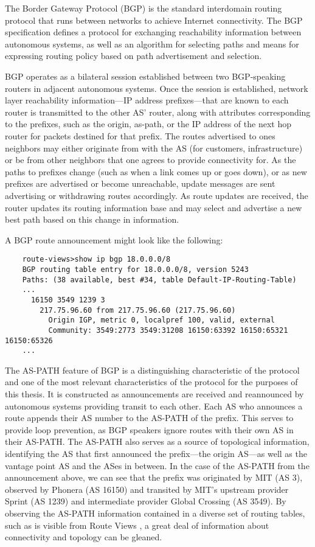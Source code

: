 The Border Gateway Protocol (BGP) is the standard interdomain routing protocol that runs between networks to achieve Internet connectivity. The BGP specification defines a protocol for exchanging reachability information between autonomous systems, as well as an algorithm for selecting paths and means for expressing routing policy based on path advertisement and selection.

BGP operates as a bilateral session established between two BGP-speaking routers in adjacent autonomous systems. Once the session is established, network layer reachability information---IP address prefixes---that are known to each router is transmitted to the other AS' router, along with attributes corresponding to the prefixes, such as the origin, as-path, or the IP address of the next hop router for packets destined for that prefix. The routes advertised to ones neighbors may either originate from with the AS (for customers, infrastructure) or be from  other neighbors that one agrees to provide connectivity for. As the paths to prefixes change (such as when a link comes up or goes down), or as new prefixes are advertised or become unreachable, update messages are sent advertising or withdrawing routes accordingly. As route updates are received, the router updates its routing information base and may select and advertise a new best path based on this change in information.

A BGP route announcement might look like the following:

\begin{verbatim}
	route-views>show ip bgp 18.0.0.0/8
	BGP routing table entry for 18.0.0.0/8, version 5243
	Paths: (38 available, best #34, table Default-IP-Routing-Table)
	...
	  16150 3549 1239 3
	    217.75.96.60 from 217.75.96.60 (217.75.96.60)
	      Origin IGP, metric 0, localpref 100, valid, external
	      Community: 3549:2773 3549:31208 16150:63392 16150:65321 16150:65326
	...
\end{verbatim}

The AS-PATH feature of BGP is a distinguishing characteristic of the protocol and one of the most relevant characteristics of the protocol for the purposes of this thesis. It is constructed as announcements are received and reannounced by autonomous systems providing transit to each other. Each AS who announces a route appends their AS number to the AS-PATH of the prefix. This serves to provide loop prevention, as BGP speakers ignore routes with their own AS in their AS-PATH. The AS-PATH also serves as a source of topological information, identifying the AS that first announced the prefix---the origin AS---as well as the vantage point AS and the ASes in between. In the case of the AS-PATH from the announcement above, we can see that the prefix was originated by MIT (AS 3), observed by Phonera (AS 16150) and transited by MIT's upstream provider Sprint (AS 1239) and intermediate provider Global Crossing (AS 3549). By observing the AS-PATH information contained in a diverse set of routing tables, such as is visible from Route Views \cite{http://www.routeviews.org}, a great deal of information about connectivity and topology can be gleaned.

